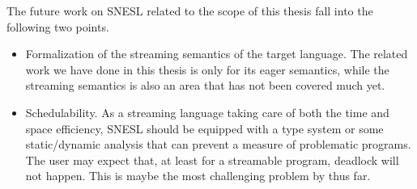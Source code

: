 The future work on SNESL related to the scope of this thesis fall into the following two points.
\begin{itemize}
		\item Formalization of the streaming semantics of the target language. 
		The related work we have done in this thesis is only for its eager semantics, while the streaming semantics is also an area that has not been covered much yet.
		
	\item Schedulability.  As a streaming language taking care of both the time and space efficiency,  SNESL should be equipped with a type system or some static/dynamic analysis that can prevent a measure of problematic programs. The user may expect that, at least for a streamable program, deadlock will not happen. This is maybe the most challenging problem by thus far. 
	

\end{itemize}


